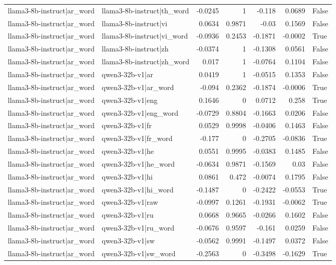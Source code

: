 \begin{table}
\begin{tabular}{l l r r r r l}
llama3-8b-instruct|ar_word & llama3-8b-instruct|th_word & -0.0245 & 1 & -0.118 & 0.0689 & False \\
llama3-8b-instruct|ar_word & llama3-8b-instruct|vi & 0.0634 & 0.9871 & -0.03 & 0.1569 & False \\
llama3-8b-instruct|ar_word & llama3-8b-instruct|vi_word & -0.0936 & 0.2453 & -0.1871 & -0.0002 & True \\
llama3-8b-instruct|ar_word & llama3-8b-instruct|zh & -0.0374 & 1 & -0.1308 & 0.0561 & False \\
llama3-8b-instruct|ar_word & llama3-8b-instruct|zh_word & 0.017 & 1 & -0.0764 & 0.1104 & False \\
llama3-8b-instruct|ar_word & qwen3-32b-v1|ar & 0.0419 & 1 & -0.0515 & 0.1353 & False \\
llama3-8b-instruct|ar_word & qwen3-32b-v1|ar_word & -0.094 & 0.2362 & -0.1874 & -0.0006 & True \\
llama3-8b-instruct|ar_word & qwen3-32b-v1|eng & 0.1646 & 0 & 0.0712 & 0.258 & True \\
llama3-8b-instruct|ar_word & qwen3-32b-v1|eng_word & -0.0729 & 0.8804 & -0.1663 & 0.0206 & False \\
llama3-8b-instruct|ar_word & qwen3-32b-v1|fr & 0.0529 & 0.9998 & -0.0406 & 0.1463 & False \\
llama3-8b-instruct|ar_word & qwen3-32b-v1|fr_word & -0.177 & 0 & -0.2705 & -0.0836 & True \\
llama3-8b-instruct|ar_word & qwen3-32b-v1|he & 0.0551 & 0.9995 & -0.0383 & 0.1485 & False \\
llama3-8b-instruct|ar_word & qwen3-32b-v1|he_word & -0.0634 & 0.9871 & -0.1569 & 0.03 & False \\
llama3-8b-instruct|ar_word & qwen3-32b-v1|hi & 0.0861 & 0.472 & -0.0074 & 0.1795 & False \\
llama3-8b-instruct|ar_word & qwen3-32b-v1|hi_word & -0.1487 & 0 & -0.2422 & -0.0553 & True \\
llama3-8b-instruct|ar_word & qwen3-32b-v1|raw & -0.0997 & 0.1261 & -0.1931 & -0.0062 & True \\
llama3-8b-instruct|ar_word & qwen3-32b-v1|ru & 0.0668 & 0.9665 & -0.0266 & 0.1602 & False \\
llama3-8b-instruct|ar_word & qwen3-32b-v1|ru_word & -0.0676 & 0.9597 & -0.161 & 0.0259 & False \\
llama3-8b-instruct|ar_word & qwen3-32b-v1|sw & -0.0562 & 0.9991 & -0.1497 & 0.0372 & False \\
llama3-8b-instruct|ar_word & qwen3-32b-v1|sw_word & -0.2563 & 0 & -0.3498 & -0.1629 & True \\

\end{tabular}
\end{table}

